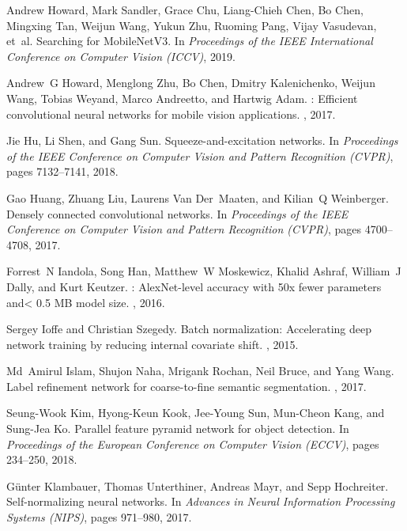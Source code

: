 \documentclass[10pt,twocolumn,letterpaper]{article}
\begin{document}
{\begin{thebibliography}{100}
	Andrew Howard, Mark Sandler, Grace Chu, Liang-Chieh Chen, Bo Chen, Mingxing
	Tan, Weijun Wang, Yukun Zhu, Ruoming Pang, Vijay Vasudevan, et~al.
	\newblock Searching for {MobileNetV3}.
	\newblock In {\em Proceedings of the IEEE International Conference on Computer
		Vision (ICCV)}, 2019.
	
	Andrew~G Howard, Menglong Zhu, Bo Chen, Dmitry Kalenichenko, Weijun Wang,
	Tobias Weyand, Marco Andreetto, and Hartwig Adam.
	: Efficient convolutional neural networks for mobile
	vision applications.
	, 2017.
	
	Jie Hu, Li Shen, and Gang Sun.
	\newblock Squeeze-and-excitation networks.
	\newblock In {\em Proceedings of the IEEE Conference on Computer Vision and
		Pattern Recognition (CVPR)}, pages 7132--7141, 2018.
	
	Gao Huang, Zhuang Liu, Laurens Van Der~Maaten, and Kilian~Q Weinberger.
	\newblock Densely connected convolutional networks.
	\newblock In {\em Proceedings of the IEEE Conference on Computer Vision and
		Pattern Recognition (CVPR)}, pages 4700--4708, 2017.
	
	Forrest~N Iandola, Song Han, Matthew~W Moskewicz, Khalid Ashraf, William~J
	Dally, and Kurt Keutzer.
	: {AlexNet}-level accuracy with 50x fewer parameters and<
	0.5 {MB} model size.
	, 2016.
	
	Sergey Ioffe and Christian Szegedy.
	\newblock Batch normalization: Accelerating deep network training by reducing
	internal covariate shift.
	, 2015.
	
	Md~Amirul Islam, Shujon Naha, Mrigank Rochan, Neil Bruce, and Yang Wang.
	\newblock Label refinement network for coarse-to-fine semantic segmentation.
	, 2017.
	
	Seung-Wook Kim, Hyong-Keun Kook, Jee-Young Sun, Mun-Cheon Kang, and Sung-Jea
	Ko.
	\newblock Parallel feature pyramid network for object detection.
	\newblock In {\em Proceedings of the European Conference on Computer Vision
		(ECCV)}, pages 234--250, 2018.
	
	G{\"u}nter Klambauer, Thomas Unterthiner, Andreas Mayr, and Sepp Hochreiter.
	\newblock Self-normalizing neural networks.
	\newblock In {\em Advances in Neural Information Processing Systems (NIPS)},
	pages 971--980, 2017.
	

\end{thebibliography}}
\end{document}
